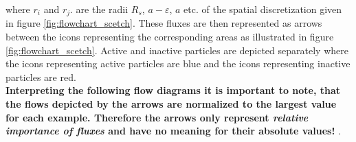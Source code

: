 where $r_i$ and $r_j$. are the radii $R_s$, $a-\varepsilon$, $a$ etc. of the spatial discretization given in figure \ref{fig:flowchart_scetch}.
These fluxes are then represented as arrows between the icons representing the corresponding areas as illustrated in figure \ref{fig:flowchart_scetch}. Active and inactive particles are depicted separately where the icons representing active particles are blue and the icons representing inactive particles are red. \\ \textbf{Interpreting the following flow diagrams it is important to note, that the flows depicted by the arrows are normalized to the largest value for each example. Therefore the arrows only represent \emph{relative importance of fluxes} and have no meaning for their absolute values!} \newpage
. \\ \vspace{-2 cm}

